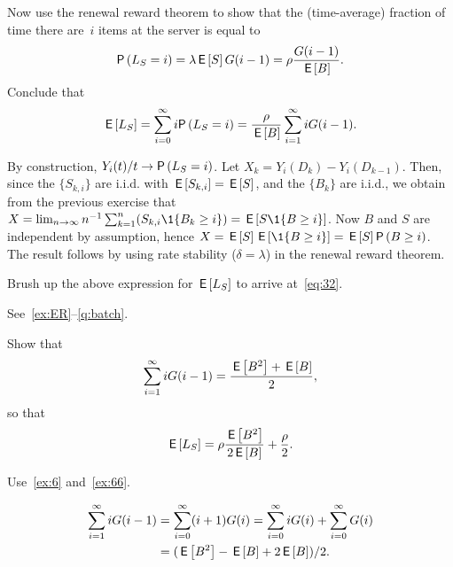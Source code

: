 \begin{exercise}
  Now use the renewal reward theorem to show that the (time-average) fraction of time there are~$i$ items at the server is equal to
  \begin{equation*}
    \P{L_S = i} = \lambda \E{S} G(i-1) = \rho \frac{G(i-1)}{\E B}.
  \end{equation*}
Conclude that
\begin{equation*}
  \E{L_S} = \sum_{i=0}^\infty i \P{L_S=i} = \frac{\rho}{\E B} \sum_{i=1}^\infty i G(i-1).
\end{equation*}
\begin{solution}
    By construction, $Y_i(t)/t \to \P{L_S=i}$.
    Let $X_k = Y_i(D_k) - Y_i(D_{k-1})$.
    Then, since the $\{S_{k, i}\}$ are i.i.d. with $\,\mathsf{E}\left[S_{k,i}\right] = \,\mathsf{E}\left[S\right]$, 
      and the $\{B_k\}$ are i.i.d.,  we obtain from the previous exercise that $X = \lim_{n\to\infty} n^{-1}\sum_{k=1}^n (S_{k,i} \1{B_{k} \geq i}) = \E{S \1{B\geq i}}$.
      Now $B$ and $S$ are independent by assumption, hence $X = \E{S} \E{\1{B\geq i}} = \E S \P{B\geq i}$.
      The result follows by using rate stability ($\delta = \lambda$) in the renewal reward theorem.
\end{solution}
\end{exercise}

\begin{exercise}
  Brush up the above expression for $\,\mathsf{E}\left[L_S\right]$  to arrive at~\cref{eq:32}.
\begin{solution}
    See~\cref{ex:ER}--\cref{q:batch}.
\end{solution}
\end{exercise}


\begin{extra}
  Show that
  \begin{equation*}
  \sum_{i=1}^\infty i G(i-1)= \frac{\,\mathsf{E}\left[B^2\right] + \,\mathsf{E}\left[B\right]}{2},
\end{equation*}
so that
\begin{equation*}
  \,\mathsf{E}\left[L_S\right] = \rho \frac{\,\mathsf{E}\left[B^2\right]}{2 \,\mathsf{E}\left[B\right]} + \frac{\rho}{2}.
\end{equation*}

\begin{hint}
    Use~\cref{ex:6} and~\cref{ex:66}.
\end{hint}
\begin{solution}
\begin{equation*}
  \begin{split}
 \sum_{i=1}^\infty i G(i-1) 
&=\sum_{i=0}^\infty (i+1) G(i) 
=\sum_{i=0}^\infty i G(i) +
\sum_{i=0}^\infty G(i)\\
&= (\,\mathsf{E}\left[B^2\right] - \,\mathsf{E}\left[B\right] + 2\,\mathsf{E}\left[B\right])/2.
  \end{split}
\end{equation*}
\end{solution}
\end{extra}


